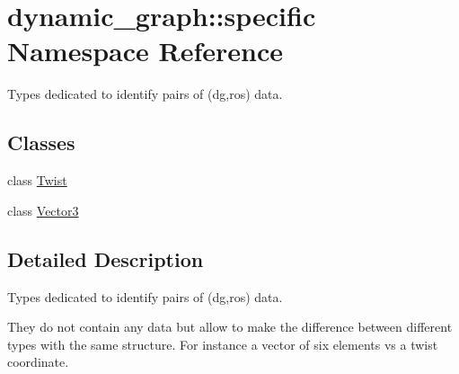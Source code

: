\hypertarget{namespacedynamic__graph_1_1specific}{}\section{dynamic\+\_\+graph\+:\+:specific Namespace Reference}
\label{namespacedynamic__graph_1_1specific}


Types dedicated to identify pairs of (dg,ros) data.  


\subsection*{Classes}
\begin{DoxyCompactItemize}
\item 
class \hyperlink{classdynamic__graph_1_1specific_1_1Twist}{Twist}
\item 
class \hyperlink{classdynamic__graph_1_1specific_1_1Vector3}{Vector3}
\end{DoxyCompactItemize}


\subsection{Detailed Description}
Types dedicated to identify pairs of (dg,ros) data. 

They do not contain any data but allow to make the difference between different types with the same structure. For instance a vector of six elements vs a twist coordinate. 